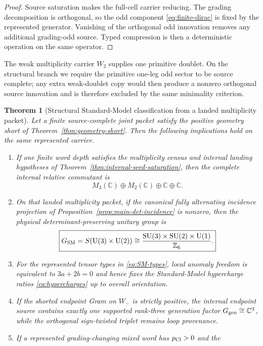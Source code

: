 \documentclass[11pt]{article}
\newtheorem{theorem}{Theorem}[section]
\theoremstyle{definition}
\theoremstyle{remark}
\newcommand{\Z}{\mathbb Z}
\newcommand{\C}{\mathbb C}
\newcommand{\U}{\mathrm U}
\newcommand{\SU}{\mathrm{SU}}
\begin{document}
\begin{proof}
Source saturation makes the full-cell carrier reducing.  The grading
decomposition is orthogonal, so the odd component
\eqref{eq:finite-dirac} is fixed by the represented generator.  Vanishing of
the orthogonal odd innovation removes any additional grading-odd source.
Typed compression is then a deterministic operation on the same operator.
\end{proof}

The weak multiplicity carrier $W_2$ supplies one primitive doublet.  On the
structural branch we require the primitive one-leg odd sector to be
source complete; any extra weak-doublet copy would then produce a nonzero
orthogonal source innovation and is therefore excluded by the same
minimality criterion.

\begin{theorem}[Structural Standard-Model classification from a landed multiplicity packet]
\label{thm:structural-SM}
Let a finite source-complete joint packet satisfy the positive geometry short
of Theorem~\ref{thm:geometry-short}.  Then the following implications hold on
the same represented carrier.
\begin{enumerate}[label=\textup{(\roman*)},leftmargin=2.8em]
\item If one finite word depth satisfies the multiplicity census and internal
      landing hypotheses of Theorem~\ref{thm:internal-seed-saturation}, then
      the complete internal relative commutant is
      \[
      \boxed{M_3(\C)\oplus M_2(\C)\oplus\C\oplus\C.}
      \]
\item On that landed multiplicity packet, if the canonical fully alternating
      incidence projection of Proposition~\ref{prop:main-det-incidence} is
      nonzero, then the physical determinant-preserving unitary group is
      \[
      \boxed{
      G_{\rm SM}
      =S(\U(3)\times\U(2))
      \cong
      \frac{\SU(3)\times\SU(2)\times\U(1)}{\Z_6}.}
      \]
\item For the represented tensor types in \eqref{eq:SM-types}, local anomaly
      freedom is equivalent to $3a+2b=0$ and hence fixes the Standard-Model
      hypercharge ratios \eqref{eq:hypercharges} up to overall orientation.
\item If the shorted endpoint Gram on $W_-$ is strictly positive, the internal
      endpoint source contains exactly one supported rank-three generation
      factor $G_{\rm gen}\cong\C^3$, while the orthogonal sign-twisted triplet
      remains loop provenance.
\item If a represented grading-changing mixed word has $p_{\rm Cl}>0$ and the

\end{enumerate}
\end{theorem}
\end{document}
